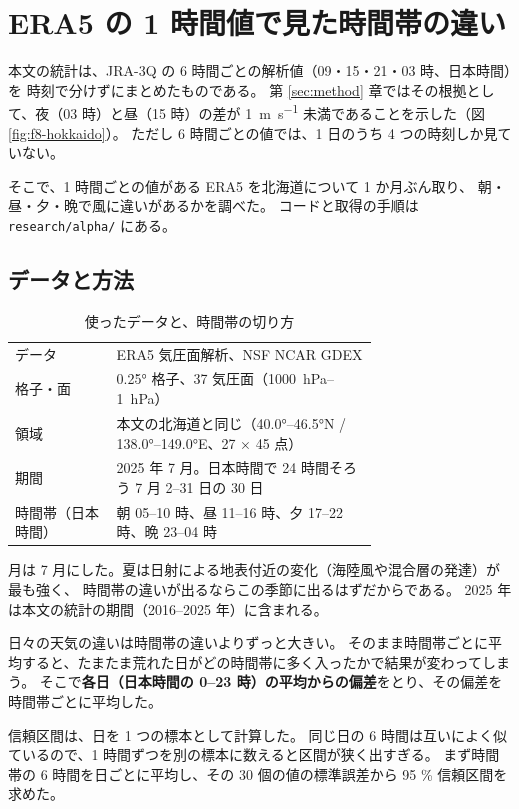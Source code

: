 \section{ERA5 の 1 時間値で見た時間帯の違い}
\label{sec:era5-diurnal}

本文の統計は、JRA-3Q の 6 時間ごとの解析値（09・15・21・03 時、日本時間）を
時刻で分けずにまとめたものである。
第 \ref{sec:method} 章ではその根拠として、夜（03 時）と昼（15 時）の差が
\SI{1}{\metre\per\second} 未満であることを示した（図\ref{fig:f8-hokkaido}）。
ただし 6 時間ごとの値では、1 日のうち 4 つの時刻しか見ていない。

そこで、1 時間ごとの値がある ERA5 \citep{hersbach2020era5} を北海道について 1 か月ぶん取り、
朝・昼・夕・晩で風に違いがあるかを調べた。
コードと取得の手順は \texttt{research/alpha/} にある。

\subsection{データと方法}

\begin{table}[H]
\centering
\caption{使ったデータと、時間帯の切り方}
\label{tab:era5-setup}
\begin{tabular}{@{}lp{0.72\linewidth}@{}}
\toprule
データ & ERA5 気圧面解析、NSF NCAR GDEX \citep{gdex_d633000} \\
格子・面 & \ang{0.25} 格子、37 気圧面（\SIrange{1000}{1}{\hecto\pascal}） \\
領域 & 本文の北海道と同じ（\ang{40.0}--\ang{46.5}N / \ang{138.0}--\ang{149.0}E、27 $\times$ 45 点） \\
期間 & 2025 年 7 月。日本時間で 24 時間そろう 7 月 2--31 日の 30 日 \\
時間帯（日本時間） & 朝 05--10 時、昼 11--16 時、夕 17--22 時、晩 23--04 時 \\
\bottomrule
\end{tabular}
\end{table}

月は 7 月にした。夏は日射による地表付近の変化（海陸風や混合層の発達）が最も強く、
時間帯の違いが出るならこの季節に出るはずだからである。
2025 年は本文の統計の期間（2016--2025 年）に含まれる。

日々の天気の違いは時間帯の違いよりずっと大きい。
そのまま時間帯ごとに平均すると、たまたま荒れた日がどの時間帯に多く入ったかで結果が変わってしまう。
そこで\textbf{各日（日本時間の 0--23 時）の平均からの偏差}をとり、その偏差を時間帯ごとに平均した。

信頼区間は、日を 1 つの標本として計算した。
同じ日の 6 時間は互いによく似ているので、1 時間ずつを別の標本に数えると区間が狭く出すぎる。
まず時間帯の 6 時間を日ごとに平均し、その 30 個の値の標準誤差から 95 \% 信頼区間を求めた。

